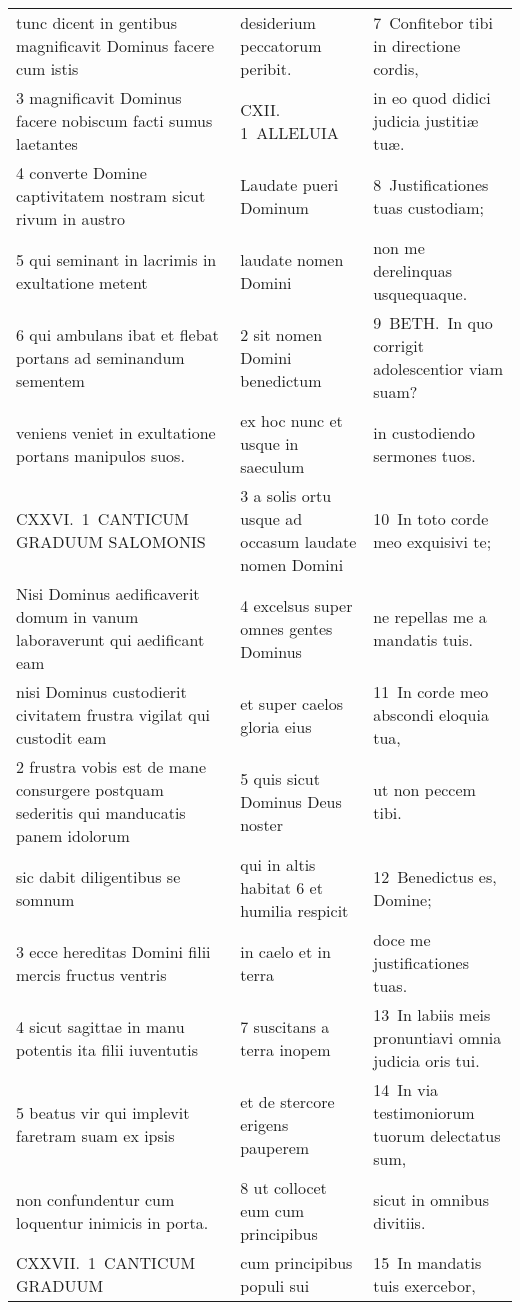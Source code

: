 \documentclass{article}
\begin{document}
\begin{longtable}{@{}p{}p{}p{}@{}}
tunc dicent in gentibus magnificavit Dominus facere cum istis	&	desiderium peccatorum peribit.	&	7 Confitebor tibi in directione cordis,	\\
3 magnificavit Dominus facere nobiscum facti sumus laetantes	&	CXII. 1 ALLELUIA	&	in eo quod didici judicia justitiæ tuæ.	\\
4 converte Domine captivitatem nostram sicut rivum in austro	&	Laudate pueri Dominum	&	8 Justificationes tuas custodiam;	\\
5 qui seminant in lacrimis in exultatione metent	&	laudate nomen Domini	&	non me derelinquas usquequaque.	\\
6 qui ambulans ibat et flebat portans ad seminandum sementem	&	2 sit nomen Domini benedictum	&	9 BETH. In quo corrigit adolescentior viam suam?	\\
veniens veniet in exultatione portans manipulos suos.	&	ex hoc nunc et usque in saeculum	&	in custodiendo sermones tuos.	\\
CXXVI. 1 CANTICUM GRADUUM SALOMONIS	&	3 a solis ortu usque ad occasum laudate nomen Domini	&	10 In toto corde meo exquisivi te;	\\
Nisi Dominus aedificaverit domum in vanum laboraverunt qui aedificant eam	&	4 excelsus super omnes gentes Dominus	&	ne repellas me a mandatis tuis.	\\
nisi Dominus custodierit civitatem frustra vigilat qui custodit eam	&	et super caelos gloria eius	&	11 In corde meo abscondi eloquia tua,	\\
2 frustra vobis est de mane consurgere postquam sederitis qui manducatis panem idolorum	&	5 quis sicut Dominus Deus noster	&	ut non peccem tibi.	\\
sic dabit diligentibus se somnum	&	qui in altis habitat 6 et humilia respicit	&	12 Benedictus es, Domine;	\\
3 ecce hereditas Domini filii mercis fructus ventris	&	in caelo et in terra	&	doce me justificationes tuas.	\\
4 sicut sagittae in manu potentis ita filii iuventutis	&	7 suscitans a terra inopem	&	13 In labiis meis pronuntiavi omnia judicia oris tui.	\\
5 beatus vir qui implevit faretram suam ex ipsis	&	et de stercore erigens pauperem	&	14 In via testimoniorum tuorum delectatus sum,	\\
non confundentur cum loquentur inimicis in porta.	&	8 ut collocet eum cum principibus	&	sicut in omnibus divitiis.	\\
CXXVII. 1 CANTICUM GRADUUM	&	cum principibus populi sui	&	15 In mandatis tuis exercebor,	\\

\end{longtable}
\end{document}
